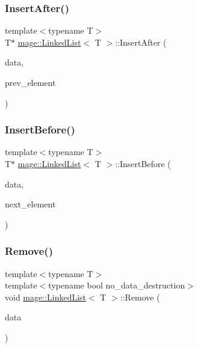 \hypertarget{classmage_1_1_linked_list_a25424001f549e03d785a219d99231044}{}\label{classmage_1_1_linked_list_a25424001f549e03d785a219d99231044} 
\subsubsection{\texorpdfstring{Insert\+After()}{InsertAfter()}}
{\footnotesize\ttfamily template$<$typename T$>$ \\
T$\ast$ \hyperlink{classmage_1_1_linked_list}{mage\+::\+Linked\+List}$<$ T $>$\+::Insert\+After (\begin{DoxyParamCaption}\item[{T $\ast$}]{data,  }\item[{\hyperlink{structmage_1_1_linked_list_1_1_linked_list_element}{Linked\+List\+Element} $\ast$}]{prev\+\_\+element }\end{DoxyParamCaption})}

\hypertarget{classmage_1_1_linked_list_a5744f0c1ae3b9e752dffdd3fdb518f5c}{}\label{classmage_1_1_linked_list_a5744f0c1ae3b9e752dffdd3fdb518f5c} 
\subsubsection{\texorpdfstring{Insert\+Before()}{InsertBefore()}}
{\footnotesize\ttfamily template$<$typename T$>$ \\
T$\ast$ \hyperlink{classmage_1_1_linked_list}{mage\+::\+Linked\+List}$<$ T $>$\+::Insert\+Before (\begin{DoxyParamCaption}\item[{T $\ast$}]{data,  }\item[{\hyperlink{structmage_1_1_linked_list_1_1_linked_list_element}{Linked\+List\+Element} $\ast$}]{next\+\_\+element }\end{DoxyParamCaption})}

\hypertarget{classmage_1_1_linked_list_a37af908f76d8e21f7591104ed85226df}{}\label{classmage_1_1_linked_list_a37af908f76d8e21f7591104ed85226df} 
\subsubsection{\texorpdfstring{Remove()}{Remove()}}
{\footnotesize\ttfamily template$<$typename T$>$ \\
template$<$typename bool no\+\_\+data\+\_\+destruction$>$ \\
void \hyperlink{classmage_1_1_linked_list}{mage\+::\+Linked\+List}$<$ T $>$\+::Remove (\begin{DoxyParamCaption}\item[{T $\ast$$\ast$}]{data }\end{DoxyParamCaption})}



